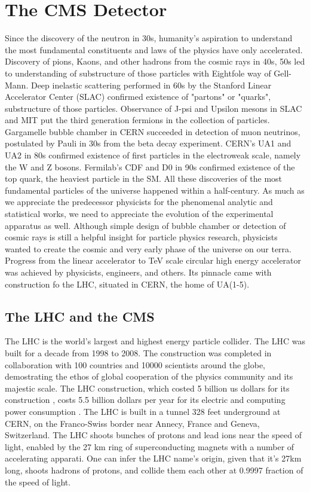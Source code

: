 \chapter{The CMS Detector}\label{sec:detectors}

Since the discovery of the neutron in 30s, humanity's aspiration to understand the most fundamental constituents and laws of the physics have only accelerated.
Discovery of pions, Kaons, and other hadrons from the cosmic rays in 40s, 50s led to understanding of substructure of those particles with Eightfole way of Gell-Mann.
Deep inelastic scattering performed in 60s by the Stanford Linear Accelerator Center (SLAC) confirmed existence of "partons" or "quarks", substructure of those particles.
Observance of J-psi and Upsilon mesons in SLAC and MIT put the third generation fermions in the collection of particles.
Gargamelle bubble chamber in CERN succeeded in detection of muon neutrinos, postulated by Pauli in 30s from the beta decay experiment.
CERN's UA1 and UA2 in 80s confirmed existence of first particles in the electroweak scale, namely the W and Z bosons.
Fermilab's CDF and D0 in 90s confirmed existence of the top quark, the heaviest particle in the SM.
All these discoveries of the most fundamental particles of the universe happened within a half-century.
As much as we appreciate the predecessor physicists for the phenomenal analytic and statistical works, we need to appreciate the evolution of the experimental apparatus as well.
Although simple design of bubble chamber or detection of cosmic rays is still a helpful insight for particle physics research, physicists wanted to create the cosmic and very early phase of the universe on our terra.
Progress from the linear accelerator to TeV scale circular high energy accelerator was achieved by physicists, engineers, and others.
Its pinnacle came with construction fo the LHC, situated in CERN, the home of UA(1-5). 



\section{The LHC and the CMS}
The LHC is the world's largest and highest energy particle collider.
The LHC was built for a decade from 1998 to 2008. 
The construction was completed in collaboration with 100 countries and 10000 scientists around the globe, demostrating the ethos of global cooperation of the physics community and its majestic scale. 
The LHC construction, which costed 5 billion us dollars for its construction , costs 5.5 billion dollars per year for its electric and computing power consumption \cite{LHCweb}.
The LHC is built in a tunnel 328 feet underground at CERN, on the Franco-Swiss border near Annecy, France and  Geneva, Switzerland.
The LHC shoots bunches of protons and lead ions near the speed of light, enabled by the 27 km ring of superconducting magnets with a number of accelerating apparati.
One can infer the LHC name's origin, given that it's 27km long, shoots hadrons of protons, and collide them each other at 0.9997 fraction of the speed of light.

